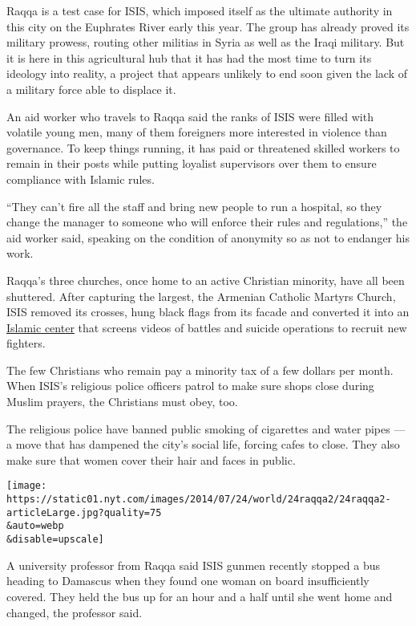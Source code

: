 Raqqa is a test case for ISIS, which imposed itself as the ultimate
authority in this city on the Euphrates River early this year. The group
has already proved its military prowess, routing other militias in Syria
as well as the Iraqi military. But it is here in this agricultural hub
that it has had the most time to turn its ideology into reality, a
project that appears unlikely to end soon given the lack of a military
force able to displace it.

An aid worker who travels to Raqqa said the ranks of ISIS were filled
with volatile young men, many of them foreigners more interested in
violence than governance. To keep things running, it has paid or
threatened skilled workers to remain in their posts while putting
loyalist supervisors over them to ensure compliance with Islamic rules.

``They can't fire all the staff and bring new people to run a hospital,
so they change the manager to someone who will enforce their rules and
regulations,'' the aid worker said, speaking on the condition of
anonymity so as not to endanger his work.

Raqqa's three churches, once home to an active Christian minority, have
all been shuttered. After capturing the largest, the Armenian Catholic
Martyrs Church, ISIS removed its crosses, hung black flags from its
facade and converted it into an
\href{http://www.alquds.co.uk/wp-content/uploads/picdata/2013/12/12-03/03qpt963.jpg}{Islamic
center} that screens videos of battles and suicide operations to recruit
new fighters.

The few Christians who remain pay a minority tax of a few dollars per
month. When ISIS's religious police officers patrol to make sure shops
close during Muslim prayers, the Christians must obey, too.

The religious police have banned public smoking of cigarettes and water
pipes --- a move that has dampened the city's social life, forcing cafes
to close. They also make sure that women cover their hair and faces in
public.

\texttt{[image: https://static01.nyt.com/images/2014/07/24/world/24raqqa2/24raqqa2-articleLarge.jpg?quality=75\\\&auto=webp\\\&disable=upscale]}

A university professor from Raqqa said ISIS gunmen recently stopped a
bus heading to Damascus when they found one woman on board
insufficiently covered. They held the bus up for an hour and a half
until she went home and changed, the professor said.

